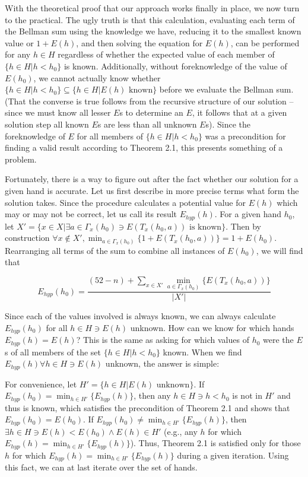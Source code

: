 \documentclass[paper=a4, fontsize=11pt,twoside]{report}   %
\begin{document}
With the theoretical proof that our approach works finally in place, we now turn to the practical. The ugly truth is that this calculation, evaluating each term of the Bellman sum using the knowledge we have, reducing it to the smallest known value or $1+E(h)$, and then solving the equation for $E(h)$, can be performed for any $h \in H$ regardless of whether the expected value of each member of $\{h \in H | h < h_0\}$ is known. Additionally, without foreknowledge of the value of $E(h_0)$, we cannot actually know whether $\{h \in H |h < h_0\} \subseteq \{h \in H | E(h) \textrm{ known}\}$ before we evaluate the Bellman sum. (That the converse is true follows from the recursive structure of our solution – since we must know all lesser $E$s to determine an $E$, it follows that at a given solution step all known $E$s are less than all unknown $E$s). Since the foreknowledge of $E$ for all members of $\{h \in H | h < h_0\}$ was a precondition for finding a valid result according to Theorem 2.1, this presents something of a problem. 

Fortunately, there is a way to figure out after the fact whether our solution for a given hand is accurate. Let us first describe in more precise terms what form the solution takes. Since the procedure calculates a potential value for $E(h)$ which may or may not be correct, let us call its result $E_{hyp}(h)$. For a given hand $h_0$, let $X' = \{x \in X | \exists a \in \Gamma_x(h_0) \ni E(T_x(h_0,a)) \textrm{ is known}\}$. Then by construction $\forall x \notin X', \min_{a \in \Gamma_x(h_0)}\{1+E(T_x(h_0,a))\}=1+E(h_0)$. Rearranging all terms of the sum to combine all instances of $E(h_0)$, we will find that 

$$E_{hyp}(h_0) = \frac{(52-n)+\sum_{x\in X'}\min_{a \in \Gamma_x(h_0)}\{E(T_x(h_0,a))\}}{|X'|}$$

Since each of the values involved is always known, we can always calculate $E_{hyp}(h_0)$ for all $h \in H \ni E(h)$ unknown. How can we know for which hands $E_{hyp}(h) = E(h)$? This is the same as asking for which values of $h_0$ were the $E$s of all members of the set $\{h \in H | h < h_0\}$ known. When we find $E_{hyp}(h) \forall h \in H \ni E(h)$ unknown, the answer is simple:

For convenience, let $H' = \{h \in H | E(h) \textrm{ unknown}\}$. If $E_{hyp}(h_0) = \min_{h \in H'}\{E_{hyp}(h)\}$, then any $h \in H \ni h < h_0$ is not in $H'$ and thus is known, which satisfies the precondition of Theorem 2.1 and shows that $E_{hyp}(h_0) = E(h_0)$. If $E_{hyp}(h_0) \ne \min_{h \in H'}\{E_{hyp}(h)\}$, then $\exists h \in H \ni E(h) < E(h_0) \wedge E(h) \in H'$ (e.g., any $h$ for which $E_{hyp}(h) = \min_{h \in H'}\{E_{hyp}(h)\}$). Thus, Theorem 2.1 is satisfied only for those $h$ for which $E_{hyp}(h) = \min_{h \in H'}\{E_{hyp}(h)\}$ during a given iteration. Using this fact, we can at last iterate over the set of hands.
\end{document}
